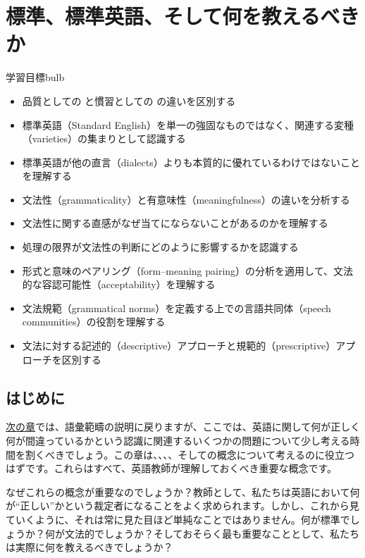 \chapter{標準、標準英語、そして何を教えるべきか}\label{sec:standards}\label{ch:standards}

\begin{tblsframedsymbol}{学習目標}{bulb}
  \begin{itemize}[noitemsep, leftmargin=*]
      \item 品質としての  と慣習としての  の違いを区別する
      \item 標準英語（Standard English）を単一の強固なものではなく、関連する変種（varieties）の集まりとして認識する
      \item 標準英語が他の直言（dialects）よりも本質的に優れているわけではないことを理解する
      \item 文法性（grammaticality）と有意味性（meaningfulness）の違いを分析する
      \item 文法性に関する直感がなぜ当てにならないことがあるのかを理解する
      \item 処理の限界が文法性の判断にどのように影響するかを認識する
      \item 形式と意味のペアリング（form--meaning pairing）の分析を適用して、文法的な容認可能性（acceptability）を理解する
      \item 文法規範（grammatical norms）を定義する上での言語共同体（speech communities）の役割を理解する
      \item 文法に対する記述的（descriptive）アプローチと規範的（prescriptive）アプローチを区別する
  \end{itemize}
  \end{tblsframedsymbol}

\section{はじめに}
\hyperref[ch:categories]{次の章}では、語彙範疇の説明に戻りますが、ここでは、英語に関して何が正しく何が間違っているかという認識に関連するいくつかの問題について少し考える時間を割くべきでしょう。この章は、、、、そしての概念について考えるのに役立つはずです。これらはすべて、英語教師が理解しておくべき重要な概念です。

なぜこれらの概念が重要なのでしょうか？教師として、私たちは英語において何が\enquote{正しい}かという裁定者になることをよく求められます。しかし、これから見ていくように、それは常に見た目ほど単純なことではありません。何が標準でしょうか？何が文法的でしょうか？そしておそらく最も重要なこととして、私たちは実際に何を教えるべきでしょうか？

